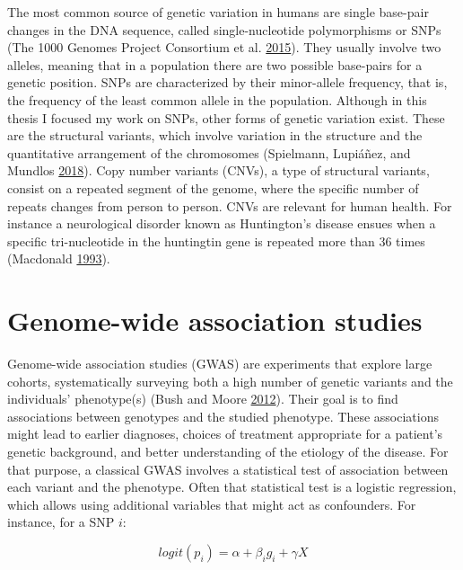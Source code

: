 \documentclass[
  11pt,
]{env/yjiao}
\begin{document}
The most common source of genetic variation in humans are single base-pair changes in the DNA sequence, called single-nucleotide polymorphisms or SNPs (The 1000 Genomes Project Consortium et al. \protect\hyperlink{ref-the_1000_genomes_project_consortium_global_2015}{2015}). They usually involve two alleles, meaning that in a population there are two possible base-pairs for a genetic position. SNPs are characterized by their minor-allele frequency, that is, the frequency of the least common allele in the population. Although in this thesis I focused my work on SNPs, other forms of genetic variation exist. These are the structural variants, which involve variation in the structure and the quantitative arrangement of the chromosomes (Spielmann, Lupiáñez, and Mundlos \protect\hyperlink{ref-spielmann_structural_2018}{2018}). Copy number variants (CNVs), a type of structural variants, consist on a repeated segment of the genome, where the specific number of repeats changes from person to person. CNVs are relevant for human health. For instance a neurological disorder known as Huntington's disease ensues when a specific tri-nucleotide in the huntingtin gene is repeated more than 36 times (Macdonald \protect\hyperlink{ref-macdonald_novel_1993}{1993}).

\hypertarget{intro-gwas}{%
\section{Genome-wide association studies}\label{intro-gwas}}

Genome-wide association studies (GWAS) are experiments that explore large cohorts, systematically surveying both a high number of genetic variants and the individuals' phenotype(s) (Bush and Moore \protect\hyperlink{ref-bush_chapter_2012}{2012}). Their goal is to find associations between genotypes and the studied phenotype. These associations might lead to earlier diagnoses, choices of treatment appropriate for a patient's genetic background, and better understanding of the etiology of the disease. For that purpose, a classical GWAS involves a statistical test of association between each variant and the phenotype. Often that statistical test is a logistic regression, which allows using additional variables that might act as confounders. For instance, for a SNP \(i\):

\begin{equation}
logit \left(p_i\right) = \alpha + \beta_i g_i + \gamma X
\label{eq:gwas-logreg}
\end{equation}
\end{document}

